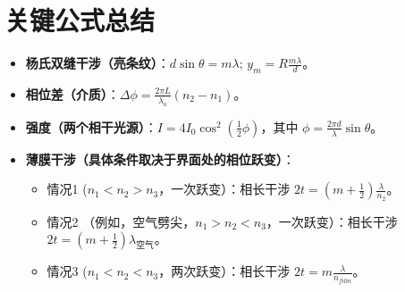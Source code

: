 \documentclass[UTF8]{ctexart}
\begin{document}
\section{关键公式总结}
\begin{itemize}
    \item \textbf{杨氏双缝干涉（亮条纹）}：$d \sin\theta = m\lambda$; $y_m = R \frac{m\lambda}{d}$。
    \item \textbf{相位差（介质）}：$\Delta\phi = \frac{2\pi L}{\lambda_a} (n_2 - n_1)$。
    \item \textbf{强度（两个相干光源）}：$I = 4I_0 \cos^2(\frac{1}{2}\phi)$，其中 $\phi = \frac{2\pi d}{\lambda}\sin\theta$。
    \item \textbf{薄膜干涉（具体条件取决于界面处的相位跃变）}：
        \begin{itemize}
            \item 情况1 ($n_1 < n_2 > n_3$，一次跃变）：相长干涉 $2t = (m + \frac{1}{2})\frac{\lambda}{n_2}$。
            \item 情况2 （例如，空气劈尖，$n_1 > n_2 < n_3$，一次跃变）：相长干涉 $2t = (m + \frac{1}{2})\lambda_{空气}$。
            \item 情况3 ($n_1 < n_2 < n_3$，两次跃变）：相长干涉 $2t = m\frac{\lambda}{n_{film}}$。
        \end{itemize}
\end{itemize}

\newpage %
\end{document}
